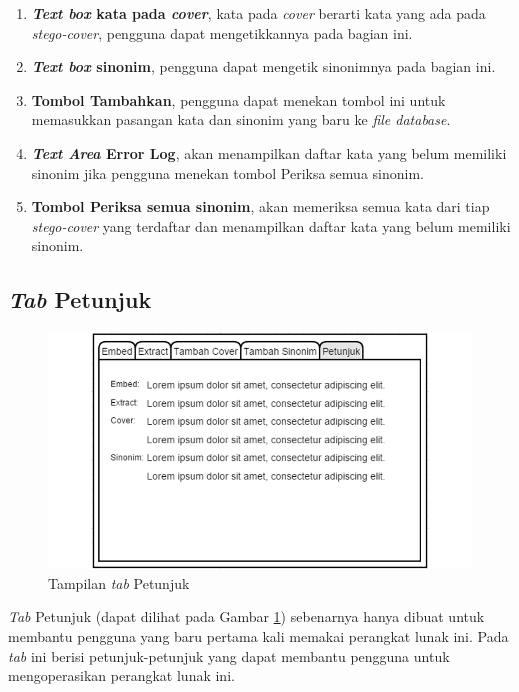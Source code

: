 \begin{enumerate}
	\item \textbf{\textit{Text box} kata pada \textit{cover}}, kata pada \textit{cover} berarti kata yang ada pada \textit{stego-cover}, pengguna dapat mengetikkannya pada bagian ini.
	\item \textbf{\textit{Text box} sinonim}, pengguna dapat mengetik sinonimnya pada bagian ini.
	\item \textbf{Tombol Tambahkan}, pengguna dapat menekan tombol ini untuk memasukkan pasangan kata dan sinonim yang baru ke \textit{file database}.
	\item \textbf{\textit{Text Area} Error Log}, akan menampilkan daftar kata yang belum memiliki sinonim jika pengguna menekan tombol Periksa semua sinonim.
	\item \textbf{Tombol Periksa semua sinonim}, akan memeriksa semua kata dari tiap \textit{stego-cover} yang terdaftar dan menampilkan daftar kata yang belum memiliki sinonim.
\end{enumerate} 

\subsection{\textit{Tab} Petunjuk}

\begin{figure}[H]
	\centering
	\includegraphics[scale=1.8]{Gambar/tab-petunjuk}
	\caption{Tampilan \textit{tab} Petunjuk} 
	\label{fig:5-tab-petunjuk}
\end{figure}

\textit{Tab} Petunjuk (dapat dilihat pada Gambar \ref{fig:5-tab-petunjuk}) sebenarnya hanya dibuat untuk membantu pengguna yang baru pertama kali memakai perangkat lunak ini. Pada \textit{tab} ini berisi petunjuk-petunjuk yang dapat membantu pengguna untuk mengoperasikan perangkat lunak ini.

